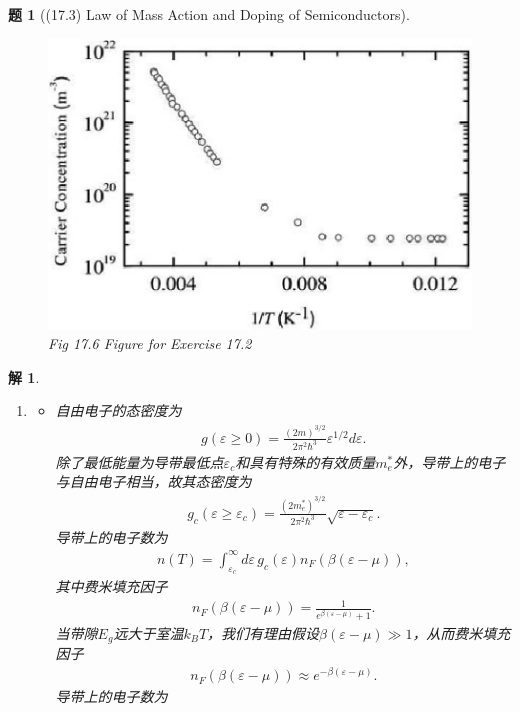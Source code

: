\documentclass[UTF8,10pt,a4paper]{article}
\theoremstyle{Problem}
\newtheorem{prob}{题}
\theoremstyle{Solution}
\newtheorem*{sol}{解}
\begin{document}
\begin{prob}[(17.3) Law of Mass Action and Doping of Semiconductors]
\begin{enumerate}
\begin{itemize}
        \end{itemize}
    \end{enumerate}
    \begin{figure}[h]
        \centering
        \includegraphics[width=.4\textwidth]{2.png}
        \caption{Fig 17.6 Figure for Exercise 17.2}
    \end{figure}
\end{prob}
\begin{sol}
    \begin{enumerate}
        \item[(a)] 
        \begin{itemize}
            \item[$\triangleright$] 自由电子的态密度为
            \begin{align}
                g(\varepsilon\geq 0)=\frac{(2m)^{3/2}}{2\pi^2\hbar^3}\varepsilon^{1/2}d\varepsilon.
            \end{align}
            除了最低能量为导带最低点$\varepsilon_c$和具有特殊的有效质量$m_e^*$外，导带上的电子与自由电子相当，故其态密度为
            \begin{align}
                g_c(\varepsilon\geq\varepsilon_c)=\frac{(2m_e^*)^{3/2}}{2\pi^2\hbar^3}\sqrt{\varepsilon-\varepsilon_c}.
            \end{align}
            导带上的电子数为
            \begin{align}
                n(T)=\int_{\varepsilon_c}^{\infty}d\varepsilon\,g_c(\varepsilon)n_F(\beta(\varepsilon-\mu)),
            \end{align}
            其中费米填充因子
            \begin{align}
                n_F(\beta(\varepsilon-\mu))=\frac{1}{e^{\beta(\varepsilon-\mu)}+1}.
            \end{align}
            当带隙$E_g$远大于室温$k_BT$，我们有理由假设$\beta(\varepsilon-\mu)\gg 1$，从而费米填充因子
            \begin{align}
                n_F(\beta(\varepsilon-\mu))\approx e^{-\beta(\varepsilon-\mu)}.
            \end{align}
            导带上的电子数为
            \begin{align}

\end{align}
\end{itemize}
\end{enumerate}
\end{sol}
\end{document}
